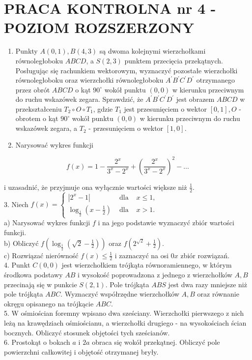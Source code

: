 \documentclass[10pt]{article}
\begin{document}
\section*{PRACA KONTROLNA nr 4 - POZIOM ROZSZERZONY}
\begin{enumerate}
  \item Punkty $A(0,1), B(4,3)$ są dwoma kolejnymi wierzchołkami równoległoboku $A B C D$, a $S(2,3)$ punktem przecięcia przekątnych. Posługując się rachunkiem wektorowym, wyznaczyć pozostałe wierzchołki równoległoboku oraz wierzchołki równoległoboku $A^{\prime} B^{\prime} C^{\prime} D^{\prime}$ otrzymanego przez obrót $A B C D$ o kąt $90^{\circ}$ wokół punktu $(0,0)$ w kierunku przeciwnym do ruchu wskazówek zegara. Sprawdzić, że $A^{\prime} B^{\prime} C^{\prime} D^{\prime}$ jest obrazem $A B C D$ w przekształceniu $T_{2} \circ O \circ T_{1}$, gdzie $T_{1}$ jest przesunięciem o wektor $[0,1], O$ - obrotem o kąt $90^{\circ}$ wokół punktu $(0,0)$ w kierunku przeciwnym do ruchu wskazówek zegara, a $T_{2}$ - przesunięciem o wektor $[1,0]$.
  \item Narysować wykres funkcji
\end{enumerate}

$$
f(x)=1-\frac{2^{x}}{3^{x}-2^{x}}+\left(\frac{2^{x}}{3^{x}-2^{x}}\right)^{2}-\ldots
$$

i uzasadnić, że przyjmuje ona wyłącznie wartości większe niż $\frac{1}{2}$.\\
3. Niech $f(x)=\left\{\begin{array}{rll}\left|2^{x}-1\right| & \text { dla } & x \leqslant 1, \\ \log _{\frac{1}{2}}\left(x-\frac{1}{2}\right) & \text { dla } & x>1 .\end{array}\right.$\\
a) Narysować wykres funkcji $f$ i na jego podstawie wyznaczyć zbiór wartości funkcji.\\
b) Obliczyć $f\left(\log _{\frac{1}{2}}\left(\sqrt{2}-\frac{1}{2}\right)\right)$ oraz $f\left(2^{\sqrt{2}}+\frac{1}{2}\right)$.\\
c) Rozwiązać nierówność $f(x) \leqslant \frac{1}{2}$ i zaznaczyć na osi $0 x$ zbiór rozwiązań.\\
4. Punkt $C(0,0)$ jest wierzchołkiem trójkąta równoramiennego, w którym środkowa podstawy $A B$ i wysokość poprowadzona z jednego z wierzchołków $A, B$ przecinają się w punkcie $S(2,1)$. Pole trójkąta $A B S$ jest dwa razy mniejsze niż pole trójkąta $A B C$. Wyznaczyć współrzędne wierzchołków $A, B$ oraz równanie okręgu opisanego na trójkącie $A B C$.\\
5. W ośmiościan foremny wpisano dwa sześciany. Wierzchołki pierwszego z nich leżą na krawędziach ośmiościanu, a wierzchołki drugiego - na wysokościach ścian bocznych. Obliczyć stosunek objętości tych sześcianów.\\
6. Prostokąt o bokach $a$ i $2 a$ obraca się wokół przekątnej. Obliczyć pole powierzchni całkowitej i objętość otrzymanej bryły.
\end{document}
